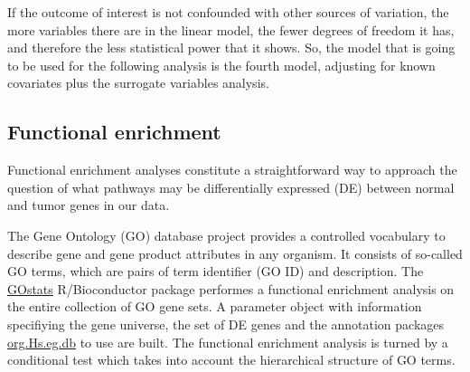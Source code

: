 \documentclass[9pt,twocolumn,twoside]{gsajnl}
\begin{document}
If the outcome of interest is not confounded with other sources of variation, the more variables there are in the linear model, the fewer degrees of freedom it has, and therefore the less statistical power that it shows. So, the model that is going to be used for the following analysis is the fourth model, adjusting for known covariates plus the surrogate variables analysis. \\
\subsection*{Functional enrichment}
Functional enrichment analyses constitute a straightforward way to approach the question of what pathways may be differentially expressed (DE) between normal and tumor genes in our data.

The Gene Ontology (GO) database project provides a controlled vocabulary to describe gene and gene product attributes in any organism. It consists of so-called GO terms, which are pairs of term identifier (GO ID) and description. The \href{http://www.bioconductor.org/packages/release/bioc/html/GOstats.html}{GOstats} R/Bioconductor package performes a functional enrichment analysis on the entire collection of GO gene sets. A parameter object with information specifiying the gene universe, the set of DE genes and the annotation packages \href{https://bioconductor.org/packages/release/data/annotation/html/org.Hs.eg.db.html}{org.Hs.eg.db} to use are built. The functional enrichment analysis is turned by a conditional test which takes into account the hierarchical structure of GO terms.




\end{document}
